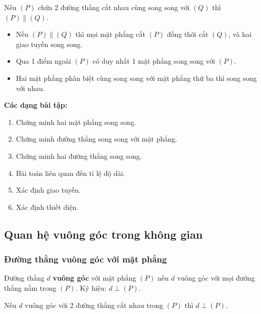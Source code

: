 \documentclass[12pt,a4paper]{article}
\begin{document}
\begin{dinhly}[title={Dấu hiệu nhận biết}]
  Nếu $(P)$ chứa 2 đường thẳng cắt nhau cùng song song với $(Q)$ thì $(P) \parallel (Q)$.
\end{dinhly}

\begin{tinhchat}
  \begin{itemize}
    \item Nếu $(P) \parallel (Q)$ thì mọi mặt phẳng cắt $(P)$ đồng thời cắt $(Q)$, và hai giao tuyến song song.
    \item Qua 1 điểm ngoài $(P)$ có duy nhất 1 mặt phẳng song song với $(P)$.
    \item Hai mặt phẳng phân biệt cùng song song với mặt phẳng thứ ba thì song song với nhau.
  \end{itemize}
\end{tinhchat}

\medskip\noindent\textbf{Các dạng bài tập:}
\begin{enumerate}[label=\textbf{Dạng \arabic*:}, leftmargin=*, align=left]
  \item Chứng minh hai mặt phẳng song song.
  \item Chứng minh đường thẳng song song với mặt phẳng.
  \item Chứng minh hai đường thẳng song song.
  \item Bài toán liên quan đến tỉ lệ độ dài.
  \item Xác định giao tuyến.
  \item Xác định thiết diện.
\end{enumerate}

\subsection{Quan hệ vuông góc trong không gian}

\subsubsection{Đường thẳng vuông góc với mặt phẳng}

\begin{dinhnghia}
  Đường thẳng $d$ \textbf{vuông góc} với mặt phẳng $(P)$ nếu $d$ vuông góc với mọi đường thẳng nằm trong $(P)$. Ký hiệu: $d \perp (P)$.
\end{dinhnghia}

\begin{dinhly}[title={Dấu hiệu nhận biết}]
  Nếu $d$ vuông góc với 2 đường thẳng cắt nhau trong $(P)$ thì $d \perp (P)$.
\end{dinhly}
\end{document}
